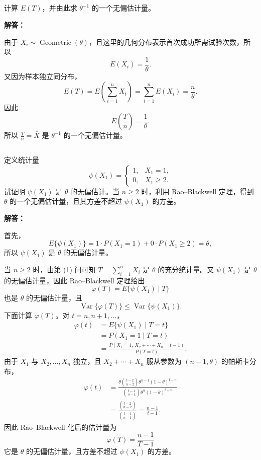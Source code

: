\documentclass[12pt,a4paper]{article}
\begin{document}
\subsection{}

  计算 $E(T)$，并由此求 $\theta^{-1}$ 的一个无偏估计量。

\begin{answerbox}
\textbf{解答：}

由于 $X_i\sim\operatorname{Geometric}(\theta)$，且这里的几何分布表示首次成功所需试验次数，所以
\[
E(X_i)=\frac1\theta.
\]
又因为样本独立同分布，
\[
E(T)=E\left(\sum_{i=1}^nX_i\right)=\sum_{i=1}^nE(X_i)=\frac{n}{\theta}.
\]
因此
\[
E\left(\frac{T}{n}\right)=\frac1\theta.
\]
所以 $\frac{T}{n}=\bar X$ 是 $\theta^{-1}$ 的一个无偏估计量。
\end{answerbox}

\subsection{}

  定义统计量
  \[
  \psi(X_1)=
  \begin{cases}
  1, & X_1=1,\\
  0, & X_1\geq 2.
  \end{cases}
  \]
  试证明 $\psi(X_1)$ 是 $\theta$ 的无偏估计。当 $n\geq 2$ 时，利用 Rao--Blackwell 定理，得到 $\theta$ 的一个无偏估计量，且其方差不超过 $\psi(X_1)$ 的方差。

\begin{answerbox}
\textbf{解答：}

首先，
\[
E\{\psi(X_1)\}=1 \cdot P(X_1=1) + 0 \cdot P(X_1\geq 2) =\theta,
\]
所以 $\psi(X_1)$ 是 $\theta$ 的无偏估计量。

当 $n\geq 2$ 时，由第 (1) 问可知 $T=\sum_{i=1}^nX_i$ 是 $\theta$ 的充分统计量。又 $\psi(X_1)$ 是 $\theta$ 的无偏估计量，因此 Rao--Blackwell 定理给出
\[
\varphi(T)=E\{\psi(X_1)\mid T\}
\]
也是 $\theta$ 的无偏估计量，且
\[
\operatorname{Var}\{\varphi(T)\}\leq \operatorname{Var}\{\psi(X_1)\}.
\]
下面计算 $\varphi(T)$。对 $t=n,n+1,\ldots$，
\[
\begin{aligned}
\varphi(t)
&=E\{\psi(X_1)\mid T=t\}\\
&=P(X_1=1\mid T=t)\\
&=\frac{P(X_1=1,\,X_2+\cdots+X_n=t-1)}{P(T=t)}.
\end{aligned}
\]
由于 $X_1$ 与 $X_2,\ldots,X_n$ 独立，且 $X_2+\cdots+X_n$ 服从参数为 $(n-1,\theta)$ 的帕斯卡分布，
\[
\begin{aligned}
\varphi(t)
&=\frac{\theta\binom{t-2}{n-2}\theta^{n-1}(1-\theta)^{t-n}}
{\binom{t-1}{n-1}\theta^n(1-\theta)^{t-n}}\\
&=\frac{\binom{t-2}{n-2}}{\binom{t-1}{n-1}}
=\frac{n-1}{t-1}.
\end{aligned}
\]
因此 Rao--Blackwell 化后的估计量为
\[
\varphi(T)=\frac{n-1}{T-1}
\]
它是 $\theta$ 的无偏估计量，且方差不超过 $\psi(X_1)$ 的方差。
\end{answerbox}
\end{document}
